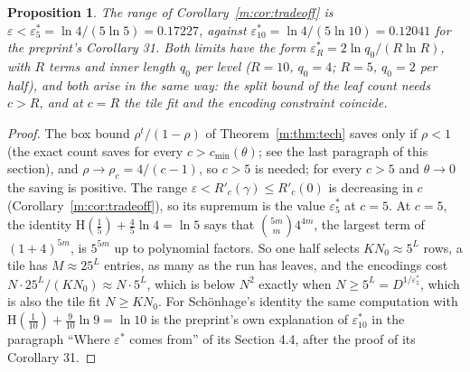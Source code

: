 \documentclass[11pt]{article}
\newtheorem{proposition}[theorem]{Proposition}
\theoremstyle{definition}
\theoremstyle{remark}
\newcommand{\Hh}{\mathrm{H}}
\newcommand{\Nz}{N_0}
\newcommand{\es}{\varepsilon^*_5}
\newcommand{\et}{\varepsilon^*_{10}}
\begin{document}
\begin{proposition}\label{m:prop:ceiling}
The range of Corollary~\ref{m:cor:tradeoff} is $\varepsilon<\es=\ln4/(5\ln5)=0.17227$, against $\et=\ln4/(5\ln10)=0.12041$ for the preprint's Corollary 31. Both limits have the form $\varepsilon^*_R=2\ln q_0/(R\ln R)$, with $R$ terms and inner length $q_0$ per level ($R=10$, $q_0=4$; $R=5$, $q_0=2$ per half), and both arise in the same way: the split bound of the leaf count needs $c>R$, and at $c=R$ the tile fit and the encoding constraint coincide.
\end{proposition}

\begin{proof}
The box bound $\rho^t/(1-\rho)$ of Theorem~\ref{m:thm:tech} saves only if $\rho<1$ (the exact count saves for every $c>c_{\min}(\theta)$; see the last paragraph of this section), and $\rho\to\rho_c=4/(c-1)$, so $c>5$ is needed; for every $c>5$ and $\theta\to0$ the saving is positive. The range $\varepsilon<R'_c(\gamma)\le R'_c(0)$ is decreasing in $c$ (Corollary~\ref{m:cor:tradeoff}), so its supremum is the value $\es$ at $c=5$. At $c=5$, the identity $\Hh(\frac15)+\frac45\ln4=\ln5$ says that $\binom{5m}m4^{4m}$, the largest term of $(1+4)^{5m}$, is $5^{5m}$ up to polynomial factors. So one half selects $K\Nz\approx5^L$ rows, a tile has $M\approx25^L$ entries, as many as the run has leaves, and the encodings cost $N\cdot25^L/(K\Nz)\approx N\cdot5^L$, which is below $N^2$ exactly when $N\ge5^L=D^{1/\es}$, which is also the tile fit $N\ge K\Nz$. For Schönhage's identity the same computation with $\Hh(\frac1{10})+\frac9{10}\ln9=\ln10$ is the preprint's own explanation of $\et$ in the paragraph ``Where $\varepsilon^*$ comes from'' of its Section 4.4, after the proof of its Corollary 31.
\end{proof}
\end{document}
